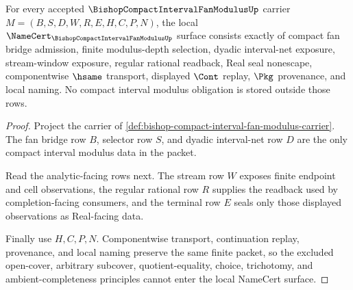 \begin{theorem}
\label{thm:bishop-compact-interval-fan-modulus-namecert-obligations}
For every accepted $\BishopCompactIntervalFanModulusUp$ carrier $M=(B,S,D,W,R,E,H,C,P,N)$, the local $\NameCert_{\BishopCompactIntervalFanModulusUp}$ surface consists exactly of compact fan bridge admission, finite modulus-depth selection, dyadic interval-net exposure, stream-window exposure, regular rational readback, Real seal nonescape, componentwise $\hsame$ transport, displayed $\Cont$ replay, $\Pkg$ provenance, and local naming. No compact interval modulus obligation is stored outside those rows.
\end{theorem}
\begin{proof}
Project the carrier of \autoref{def:bishop-compact-interval-fan-modulus-carrier}. The fan bridge row $B$, selector row $S$, and dyadic interval-net row $D$ are the only compact interval modulus data in the packet.

Read the analytic-facing rows next. The stream row $W$ exposes finite endpoint and cell observations, the regular rational row $R$ supplies the readback used by completion-facing consumers, and the terminal row $E$ seals only those displayed observations as Real-facing data.

Finally use $H,C,P,N$. Componentwise transport, continuation replay, provenance, and local naming preserve the same finite packet, so the excluded open-cover, arbitrary subcover, quotient-equality, choice, trichotomy, and ambient-completeness principles cannot enter the local NameCert surface.
\end{proof}

